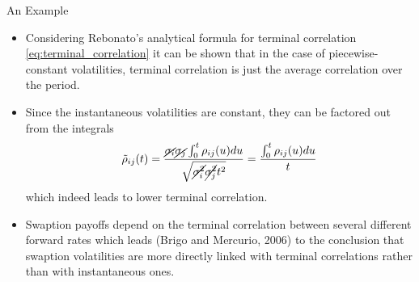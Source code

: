 \documentclass{beamer}
\begin{document}
\begin{frame}{An Example}
\begin{itemize}
	\item<1-> Considering Rebonato's analytical formula for terminal correlation \cref{eq:terminal_correlation} it can be shown that in the case of piecewise-constant volatilities, terminal correlation is just the average correlation over the period. 
  	\item<2-> Since the instantaneous volatilities are constant, they can be factored out from the integrals
	  \begin{equation*}	    \tilde{\rho}_{ij}(t)=\frac{\cancel{\sigma_i}\cancel{\sigma_j}\int_0^t\rho_{ij}(u)du}{\sqrt{\cancel{\sigma_i^2}\cancel{\sigma_j^2} t^2}}= \frac{\int_0^t\rho_{ij}(u)du}{t}		
  	\end{equation*}
  	which indeed leads to lower terminal correlation.
  	\item<3-> Swaption payoffs depend on the terminal correlation between several different forward rates which leads (Brigo and Mercurio, 2006) to the conclusion that swaption volatilities are more directly linked with terminal correlations rather than with instantaneous ones.
  \end{itemize}
\end{frame}
\end{document}
